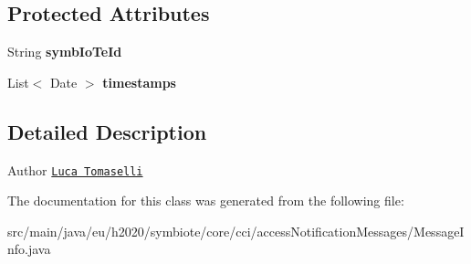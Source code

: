 \subsection*{Protected Attributes}
\begin{DoxyCompactItemize}
\item 
\mbox{\label{classeu_1_1h2020_1_1symbiote_1_1core_1_1cci_1_1accessNotificationMessages_1_1MessageInfo_a6cea568a86641b129fa6d3eae2d06a62}} 
String {\bfseries symb\+Io\+Te\+Id}
\item 
\mbox{\label{classeu_1_1h2020_1_1symbiote_1_1core_1_1cci_1_1accessNotificationMessages_1_1MessageInfo_a2f79c1a4594a55b517d62f81cc6b16f4}} 
List$<$ Date $>$ {\bfseries timestamps}
\end{DoxyCompactItemize}


\subsection{Detailed Description}
\begin{DoxyAuthor}{Author}
\href{mailto:l.tomaselli@nextworks.it}{\tt Luca Tomaselli} 
\end{DoxyAuthor}


The documentation for this class was generated from the following file\+:\begin{DoxyCompactItemize}
\item 
src/main/java/eu/h2020/symbiote/core/cci/access\+Notification\+Messages/Message\+Info.\+java\end{DoxyCompactItemize}
